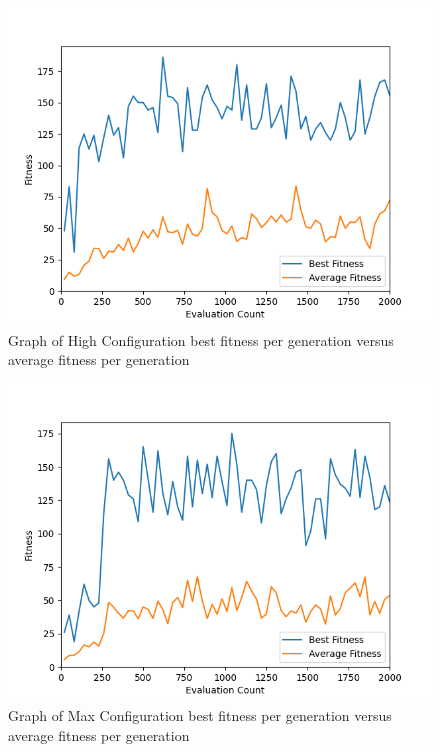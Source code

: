 \begin{figure}[H]
    \centering
    \includegraphics[width=.8\linewidth]{images/graphs/high_config_best_avg.png}
    \caption{Graph of High Configuration best fitness per generation versus average fitness per generation}
    \label{high_best_avg}
\end{figure}

\begin{figure}[H]
    \centering
    \includegraphics[width=.8\linewidth]{images/graphs/max_config_best_avg.png}
    \caption{Graph of Max Configuration best fitness per generation versus average fitness per generation}
    \label{max_best_avg}
\end{figure}